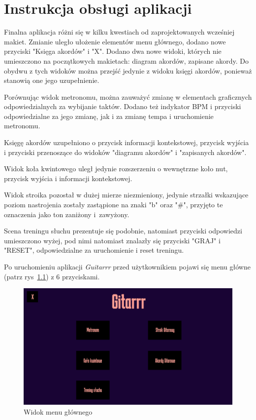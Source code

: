 \chapter{Instrukcja obsługi aplikacji}

Finalna aplikacja różni się w kilku kwestiach od zaprojektowanych wcześniej makiet. Zmianie uległo ułożenie elementów menu głównego, dodano nowe przyciski "Księga akordów" i "X". Dodano dwa nowe widoki, których nie umieszczono na początkowych makietach: diagram akordów, zapisane akordy. Do obydwu z tych widoków można przejść jedynie z widoku księgi akordów, ponieważ stanowią one jego uzupełnienie. 

Porównując widok metronomu, można zauważyć zmianę w elementach graficznych odpowiedzialnych za wybijanie taktów. Dodano też indykator BPM i przyciski odpowiedzialne za jego zmianę, jak i za zmianę tempa i uruchomienie metronomu.

Księgę akordów uzupełniono o przycisk informacji kontekstowej, przycisk wyjścia i przyciski przenoszące do widoków "diagramu akordów" i "zapisanych akordów".

Widok koła kwintowego uległ jedynie rozszerzeniu o wewnętrzne koło nut, przycisk wyjścia i informacji kontekstowej.

Widok stroika pozostał w dużej mierze niezmieniony, jedynie strzałki wskazujące poziom nastrojenia zostały zastąpione na znaki "b" oraz "\#", przyjęto te oznaczenia jako ton zaniżony i~zawyżony.

Scena treningu słuchu prezentuje się podobnie, natomiast przyciski odpowiedzi umieszczono wyżej, pod nimi natomiast znalazły się przyciski "GRAJ" i "RESET", odpowiedzialne za uruchomienie i reset treningu.

Po uruchomieniu aplikacji \emph{Guitarrr} przed użytkownikiem pojawi się menu główne (patrz rys~\ref{fig:Menu}) z 6 przyciskami.

\begin{figure}[htb]
	\centering
	\includegraphics[width=.50\linewidth]{rysB/MenuG}
	\caption{Widok menu głównego} \label{fig:Menu}
\end{figure}

